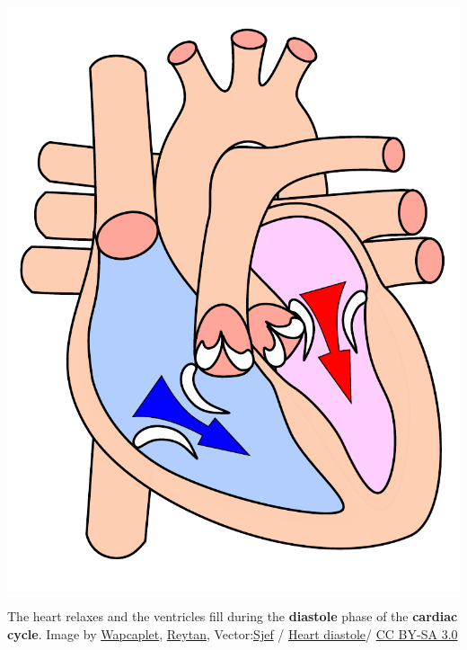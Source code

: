 \documentclass[
  letterpaper,
  DIV=11,
  numbers=noendperiod,
  oneside]{scrartcl}
\begin{document}
\begin{marginfigure}

{\centering \includegraphics{Lab3_files/mediabag/../../images/Heart_diasystole.pdf}

}

\caption{\label{fig-diastole}The heart relaxes and the ventricles fill
during the \textbf{diastole} phase of the \textbf{cardiac cycle}. Image
by \href{https://en.wikipedia.org/wiki/User:Wapcaplet}{Wapcaplet},
\href{https://commons.wikimedia.org/wiki/User:Reytan}{Reytan},
Vector:\href{https://commons.wikimedia.org/wiki/User:Sjef}{Sjef} /
\href{https://commons.wikimedia.org/wiki/File:Heart_diasystole.svg}{Heart
diastole}/ \href{https://creativecommons.org/licenses/by-sa/3.0/}{CC
BY-SA 3.0}}

\end{marginfigure}
\end{document}

